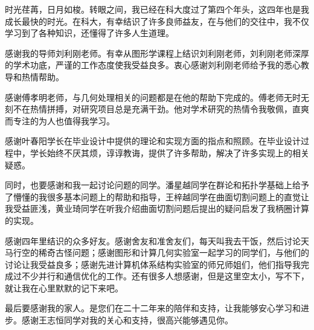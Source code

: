 
\begin{acknowledgements}

时光荏苒，日月如梭。转眼之间，我已经在科大度过了第四个年头，这四年也是我成长最快的时光。在科大，有幸结识了许多良师益友，在与他们的交往中，我不仅学习到了各种知识，还懂得了许多人生道理。

感谢我的导师刘利刚老师。有幸从图形学课程上结识刘利刚老师，刘利刚老师深厚的学术功底，严谨的工作态度使我受益良多。衷心感谢刘利刚老师给予我的悉心教导和热情帮助。

感谢傅孝明老师，与几何处理相关的问题都是在他的帮助下完成的。傅老师无时无刻不在热情拼搏，对研究项目总是充满干劲。他对学术研究的热情令我敬佩，直爽而专注的为人也值得我学习。

感谢叶春阳学长在毕业设计中提供的理论和实现方面的指点和照顾。在毕业设计过程中，学长始终不厌其烦，谆谆教诲，提供了许多帮助，解决了许多实现上的相关疑惑。

同时，也要感谢和我一起讨论问题的同学。潘星越同学在群论和拓扑学基础上给予了懵懂的我很多基本问题上的帮助和指导，王梓越同学在曲面切割问题上的直觉让我受益匪浅，黄业琦同学在听我介绍曲面切割问题后提出的疑问启发了我柄圈计算的实现。

感谢四年里结识的众多好友。感谢舍友和准舍友们，每天叫我去干饭，然后讨论天马行空的稀奇古怪问题；感谢图形和计算几何实验室一起学习的同学们，与他们的讨论让我受益良多；感谢先进计算机体系结构实验室的师兄师姐们，他们指导我完成过不少并行和通信优化的工作。还有很多人想感谢，但是这里空太小，写不下，就让我在心里默默的记下来吧。

最后要感谢我的家人。是您们在二十二年来的陪伴和支持，让我能够安心学习和进步。感谢王志恒同学对我的关心和支持，很高兴能够遇见你。

\end{acknowledgements}
